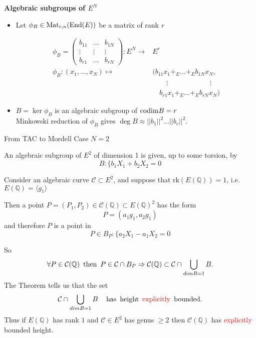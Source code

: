 \documentclass[12pt]{beamer}
\newcommand{\codim}{{\rm{codim}}}
\newcommand{\qe}{\mathbb{Q}}
\newcommand{\Ci}{\mathcal{C}}
\begin{document}
\begin{frame} {\bf Algebraic subgroups of $E^N$}
\small\begin{itemize}
\item   Let $\phi_B\in{ \rm{Mat}}_{r,n}({\rm End}(E))$ be a matrix of rank $r$\pause
  {\begin{tcolorbox}					\begin{equation*}
\begin{split}
\phi_B= 
 \left(\begin{array}{cccccc}
b_{11}&\dots &b_{1N}\\
 \vdots & \vdots&  \vdots\\
b_{r1}&\dots &b_{rN}
\end{array}\right): E^N\to & E^r\\
\phi_B:(x_1,\dots,x_N) \mapsto &({b_{11}}x_1+_E ...+_E{b_{1N}}x_N, 
\\ \phantom{bsbkbjkdff}&\quad\quad\vdots \quad  \phantom{bfdghdgf}  \quad \vdots
\\ \phantom{bnnf}&\quad {b_{r1}}x_1+_E...+_E {b_{rN}}x_N)
\end{split}
\end{equation*}


				\end{tcolorbox}}\pause
\item $B= \ker \phi_B $ is an algebraic subgroup of $\codim B= r$\pause \\
Minkowski reduction of $\phi_B$ gives $\deg B \approx ||b_1||^2\dots ||b_r||^2$.


\end{itemize}
\end{frame}







\begin{frame}{From TAC to Mordell}
{Case $N=2$}

An algebraic subgroup of $E^2$ of dimension 1 is given, up to some torsion, by
$$B:\{ b_1X_1+b_2X_2=0$$

Consider an algebraic curve $\Ci\subset E^2$, and suppose that $\mathrm{rk}(E(\qe))= 1$, i.e. $E(\qe)=\langle g_1\rangle$

Then a point $P=(P_1,P_2)\in \Ci(\qe)\subset E(\qe)^2$ has the form $$P=(a_1 g_1,a_2 g_1)$$ and therefore $P$ is a point in 
$$P \in B_P:\{ a_2X_1-a_1X_2=0$$

So $$\forall P \in \Ci(\qe) \,\,\, {\rm then} \,\,\,  P \in \Ci \cap B_P \Rightarrow \Ci(\qe)\subset \Ci \cap \bigcup_{dim B=1} B.$$ 
 The Theorem tells us that   the set $$\Ci \cap \bigcup_{dim B=1} B \quad {\rm \, has \,\,\, height \,\,\,  {\textcolor{red}{explicitly} }\,\,\, bounded.}$$  Thus   if $E(\qe)$ has rank $1$ and $\Ci \in E^2$ has genus $\ge 2$ then $\Ci(\qe)$ has {\textcolor{red}{explicitly}}  bounded height.
 \end{frame}
\end{document}
